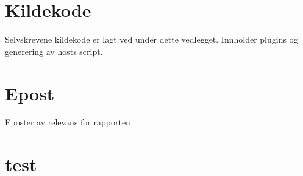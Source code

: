 \documentclass[a4paper,twoside,11pt,pdftex,norsk]{report}
\newenvironment{changemargin}[2]{%
\begin{list}{}{%
\linespread{0.9}%
\setlength{\topsep}{0pt}%
\setlength{\leftmargin}{#1}%
\setlength{\rightmargin}{#2}%
\setlength{\listparindent}{\parindent}%
\setlength{\itemindent}{\parindent}%
\setlength{\parsep}{\parskip}%
}%
\item[]}{\end{list}}
\begin{document}
\begin{appendices}
\chapter{Kildekode}
Selvskrevene kildekode er lagt ved under dette vedlegget. Innholder plugins og generering av hosts script.

\begin{changemargin}{-1cm}{-1cm}


\end{changemargin}

\chapter{Epost}
Eposter av relevans for rapporten

\chapter{test}

\end{appendices}
\end{document}
